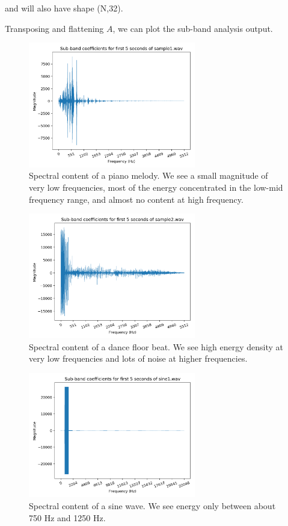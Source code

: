 \documentclass[11pt,a4paper]{article}
\begin{document}
and will also have shape (N,32).

Transposing and flattening $A$, we can plot the sub-band analysis output.

\pagebreak

\begin{figure}[ht]
	\centering
	\includegraphics[width=0.65\textwidth]{analysis/sample1}
	\caption{Spectral content of a piano melody. We see a small magnitude of very low frequencies, most of the energy concentrated in the low-mid frequency range, and almost no content at high frequency.}
	\label{fig:analysis_sample1}
\end{figure}

\begin{figure}[ht]
	\centering
	\includegraphics[width=0.65\textwidth]{analysis/sample2}
	\caption{Spectral content of a dance floor beat. We see high energy density at very low frequencies and lots of noise at higher frequencies.}
	\label{fig:analysis_sample2}
\end{figure}

\clearpage

\begin{figure}[ht]
	\centering
	\includegraphics[width=0.65\textwidth]{analysis/sine1}
	\caption{Spectral content of a sine wave. We see energy only between about 750 Hz and 1250 Hz.}
	\label{fig:analysis_sine1}
\end{figure}
\end{document}
